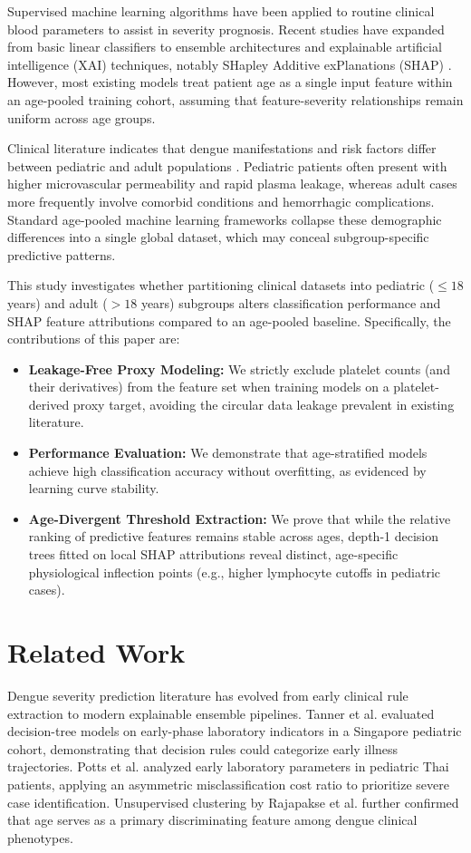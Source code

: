 \documentclass[conference]{IEEEtran}
\begin{document}
Supervised machine learning algorithms have been applied to routine clinical blood parameters to assist in severity prognosis. Recent studies have expanded from basic linear classifiers to ensemble architectures and explainable artificial intelligence (XAI) techniques, notably SHapley Additive exPlanations (SHAP) \cite{chowdhury2022, masum2025, niazi2026, das2025}. However, most existing models treat patient age as a single input feature within an age-pooled training cohort, assuming that feature-severity relationships remain uniform across age groups.

Clinical literature indicates that dengue manifestations and risk factors differ between pediatric and adult populations \cite{potts2010, tanner2008}. Pediatric patients often present with higher microvascular permeability and rapid plasma leakage, whereas adult cases more frequently involve comorbid conditions and hemorrhagic complications. Standard age-pooled machine learning frameworks collapse these demographic differences into a single global dataset, which may conceal subgroup-specific predictive patterns.

This study investigates whether partitioning clinical datasets into pediatric ($\le 18$ years) and adult ($> 18$ years) subgroups alters classification performance and SHAP feature attributions compared to an age-pooled baseline. Specifically, the contributions of this paper are:
\begin{itemize}
    \item \textbf{Leakage-Free Proxy Modeling:} We strictly exclude platelet counts (and their derivatives) from the feature set when training models on a platelet-derived proxy target, avoiding the circular data leakage prevalent in existing literature.
    \item \textbf{Performance Evaluation:} We demonstrate that age-stratified models achieve high classification accuracy without overfitting, as evidenced by learning curve stability.
    \item \textbf{Age-Divergent Threshold Extraction:} We prove that while the relative ranking of predictive features remains stable across ages, depth-1 decision trees fitted on local SHAP attributions reveal distinct, age-specific physiological inflection points (e.g., higher lymphocyte cutoffs in pediatric cases).
\end{itemize}

\section{Related Work}
Dengue severity prediction literature has evolved from early clinical rule extraction to modern explainable ensemble pipelines. Tanner et al. \cite{tanner2008} evaluated decision-tree models on early-phase laboratory indicators in a Singapore pediatric cohort, demonstrating that decision rules could categorize early illness trajectories. Potts et al. \cite{potts2010} analyzed early laboratory parameters in pediatric Thai patients, applying an asymmetric misclassification cost ratio to prioritize severe case identification. Unsupervised clustering by Rajapakse et al. \cite{rajapakse2014} further confirmed that age serves as a primary discriminating feature among dengue clinical phenotypes.
\end{document}
